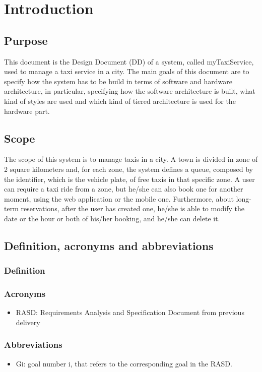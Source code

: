\section{Introduction}
\subsection{Purpose}
	This document is the Design Document (DD) of a system, called myTaxiService, used to manage  a taxi service in a city. The main goals of this document are to specify how the system has to be build in terms of software and hardware architecture, in particular, specifying how the software architecture is built, what kind of styles are used and which kind of tiered architecture is used for the hardware part.
\subsection{Scope}
	The scope of this system is to manage taxis in a city. A town is divided in zone of 2 square kilometers and, for each zone, the system defines a queue, composed by the identifier, which is the vehicle plate, of free taxis in that specific zone. A user can require a taxi ride from a zone, but he/she can also book one for another moment, using the web application or the mobile one. Furthermore, about long-term reservations, after the user has created one, he/she is able to modify the date or the hour or both of his/her booking, and he/she can delete it. 
\subsection{Definition, acronyms and abbreviations}
	\subsubsection{Definition}
	\subsubsection{Acronyms}
		 \begin{itemize}
		 	\item RASD: Requirements Analysis and Specification Document from previous delivery
		 \end{itemize}
	\subsubsection{Abbreviations}
		\begin{itemize}
			\item Gi: goal number i, that refers to the corresponding goal in the RASD.
		\end{itemize}
